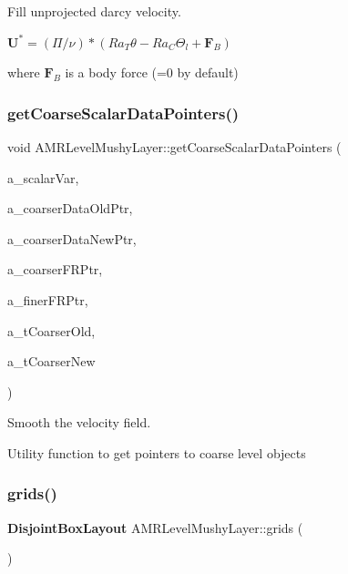 Fill unprojected darcy velocity. 

$ \mathbf{U}^* = (\Pi/\nu) * (Ra_T \theta - Ra_C \Theta_l + \mathbf{F}_B) $

where $ \mathbf{F}_B $ is a body force (=0 by default) \mbox{\label{class_a_m_r_level_mushy_layer_a0e1a5d490de9799a0579aa3bcc35a021}} 
\subsubsection{\texorpdfstring{get\+Coarse\+Scalar\+Data\+Pointers()}{getCoarseScalarDataPointers()}}
{\footnotesize\ttfamily void A\+M\+R\+Level\+Mushy\+Layer\+::get\+Coarse\+Scalar\+Data\+Pointers (\begin{DoxyParamCaption}\item[{const int}]{a\+\_\+scalar\+Var,  }\item[{\textbf{ Level\+Data}$<$ \textbf{ F\+Array\+Box} $>$ $\ast$$\ast$}]{a\+\_\+coarser\+Data\+Old\+Ptr,  }\item[{\textbf{ Level\+Data}$<$ \textbf{ F\+Array\+Box} $>$ $\ast$$\ast$}]{a\+\_\+coarser\+Data\+New\+Ptr,  }\item[{\textbf{ Level\+Flux\+Register} $\ast$$\ast$}]{a\+\_\+coarser\+F\+R\+Ptr,  }\item[{\textbf{ Level\+Flux\+Register} $\ast$$\ast$}]{a\+\_\+finer\+F\+R\+Ptr,  }\item[{\textbf{ Real} \&}]{a\+\_\+t\+Coarser\+Old,  }\item[{\textbf{ Real} \&}]{a\+\_\+t\+Coarser\+New }\end{DoxyParamCaption})\hspace{0.3cm}{\ttfamily [protected]}}



Smooth the velocity field. 

Utility function to get pointers to coarse level objects \mbox{\label{class_a_m_r_level_mushy_layer_afbb2adb1dd99e2b69bcb58d5395fe3b5}} 
\subsubsection{\texorpdfstring{grids()}{grids()}}
{\footnotesize\ttfamily \textbf{ Disjoint\+Box\+Layout} A\+M\+R\+Level\+Mushy\+Layer\+::grids (\begin{DoxyParamCaption}{ }\end{DoxyParamCaption})}



